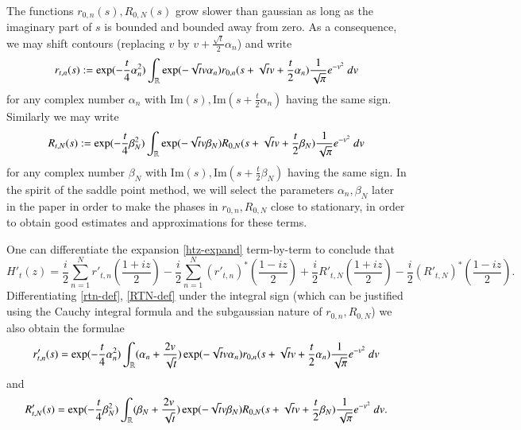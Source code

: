 The functions $r_{0,n}(s), R_{0,N}(s)$ grow slower than gaussian as long as the imaginary part of $s$ is bounded and bounded away from zero.  As a consequence, we may shift contours (replacing $v$ by $v + \frac{\sqrt{t}}{2} \alpha_n$) and write
\begin{equation}\label{rtn-def}
 r_{t,n}(s) := \exp( - \frac{t}{4} \alpha_n^2) \int_{\mathbb{R}} \exp( - \sqrt{t} v \alpha_n) r_{0,n}( s + \sqrt{t} v + \frac{t}{2} \alpha_n) \frac{1}{\sqrt{\pi}} e^{-v^2}\ dv
\end{equation}
for any complex number $\alpha_n$ with $\mathrm{Im}(s), \mathrm{Im}(s + \frac{t}{2} \alpha_n)$ having the same sign.  Similarly we may write
\begin{equation}\label{RTN-def}
 R_{t,N}(s) := \exp( - \frac{t}{4} \beta_N^2) \int_{\mathbb{R}} \exp( - \sqrt{t} v \beta_N) R_{0,N}( s + \sqrt{t} v + \frac{t}{2} \beta_N) \frac{1}{\sqrt{\pi}} e^{-v^2}\ dv
\end{equation}
for any complex number $\beta_N$ with $\mathrm{Im}(s), \mathrm{Im}(s + \frac{t}{2} \beta_N)$ having the same sign.  In the spirit of the saddle point method, we will select the parameters $\alpha_n, \beta_N$ later in the paper in order to make the phases in $r_{0,n}, R_{0,N}$ close to stationary, in order to obtain good estimates and approximations for these terms.

One can differentiate the expansion \eqref{htz-expand} term-by-term to conclude that
$$
 H'_t(z) = \frac{i}{2} \sum_{n=1}^N r'_{t,n}(\frac{1+iz}{2}) -\frac{i}{2} \sum_{n=1}^N (r'_{t,n})^*(\frac{1-iz}{2}) + \frac{i}{2} R'_{t,N}(\frac{1+iz}{2}) - \frac{i}{2} (R'_{t,N})^*(\frac{1-iz}{2}).$$
Differentiating \eqref{rtn-def}, \eqref{RTN-def} under the integral sign (which can be justified using the Cauchy integral formula and the subgaussian nature of $r_{0,n}, R_{0,N}$) we also obtain the formulae
\begin{equation}\label{rtn-deriv}
 r'_{t,n}(s) = \exp( - \frac{t}{4} \alpha_n^2) \int_{\mathbb{R}} (\alpha_n + \frac{2v}{\sqrt{t}}) \exp( - \sqrt{t} v \alpha_n) r_{0,n}( s + \sqrt{t} v + \frac{t}{2} \alpha_n) \frac{1}{\sqrt{\pi}} e^{-v^2}\ dv
\end{equation}
and
\begin{equation}\label{RTN-deriv}
 R'_{t,N}(s) = \exp( - \frac{t}{4} \beta_N^2) \int_{\mathbb{R}} (\beta_N + \frac{2v}{\sqrt{t}}) \exp( - \sqrt{t} v \beta_N) R_{0,N}( s + \sqrt{t} v + \frac{t}{2} \beta_N) \frac{1}{\sqrt{\pi}} e^{-v^2}\ dv.
\end{equation}









